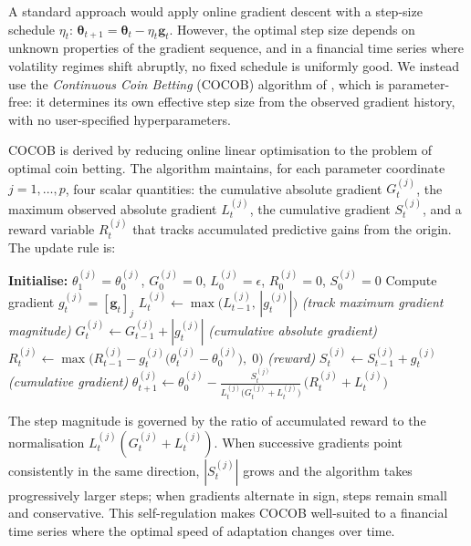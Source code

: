 A standard approach would apply online gradient descent with a step-size schedule $\eta_t$: $\boldsymbol{\theta}_{t+1} = \boldsymbol{\theta}_t - \eta_t \mathbf{g}_t$. However, the optimal step size depends on unknown properties of the gradient sequence, and in a financial time series where volatility regimes shift abruptly, no fixed schedule is uniformly good. We instead use the \emph{Continuous Coin Betting} (COCOB) algorithm of \citet{orabona2017training}, which is parameter-free: it determines its own effective step size from the observed gradient history, with no user-specified hyperparameters.

COCOB is derived by reducing online linear optimisation to the problem of optimal coin betting. The algorithm maintains, for each parameter coordinate $j = 1, \ldots, p$, four scalar quantities: the cumulative absolute gradient $G_t^{(j)}$, the maximum observed absolute gradient $L_t^{(j)}$, the cumulative gradient $S_t^{(j)}$, and a reward variable $R_t^{(j)}$ that tracks accumulated predictive gains from the origin. The update rule is:

\begin{algorithm}[H]
\caption{COCOB Parameter Update (coordinate $j = 1, \ldots, p$)}
\label{alg:cocob}
\begin{algorithmic}[1]
\State \textbf{Initialise:} $\theta_1^{(j)} = \theta_0^{(j)}$, \; $G_0^{(j)} = 0$, \; $L_0^{(j)} = \epsilon$, \; $R_0^{(j)} = 0$, \; $S_0^{(j)} = 0$
    \State Compute gradient $g_t^{(j)} = [\mathbf{g}_t]_j$
    \State $L_t^{(j)} \gets \max\!\bigl(L_{t-1}^{(j)},\, |g_t^{(j)}|\bigr)$ \hfill\textit{(track maximum gradient magnitude)}
    \State $G_t^{(j)} \gets G_{t-1}^{(j)} + |g_t^{(j)}|$ \hfill\textit{(cumulative absolute gradient)}
    \State $R_t^{(j)} \gets \max\!\bigl(R_{t-1}^{(j)} - g_t^{(j)}\bigl(\theta_t^{(j)} - \theta_0^{(j)}\bigr),\; 0\bigr)$ \hfill\textit{(reward)}
    \State $S_t^{(j)} \gets S_{t-1}^{(j)} + g_t^{(j)}$ \hfill\textit{(cumulative gradient)}
    \State $\displaystyle \theta_{t+1}^{(j)} \gets \theta_0^{(j)} - \frac{S_t^{(j)}}{L_t^{(j)}\bigl(G_t^{(j)} + L_t^{(j)}\bigr)} \,\bigl(R_t^{(j)} + L_t^{(j)}\bigr)$
\EndFor
\end{algorithmic}
\end{algorithm}

The step magnitude is governed by the ratio of accumulated reward to the normalisation $L_t^{(j)}(G_t^{(j)} + L_t^{(j)})$. When successive gradients point consistently in the same direction, $|S_t^{(j)}|$ grows and the algorithm takes progressively larger steps; when gradients alternate in sign, steps remain small and conservative. This self-regulation makes COCOB well-suited to a financial time series where the optimal speed of adaptation changes over time.

